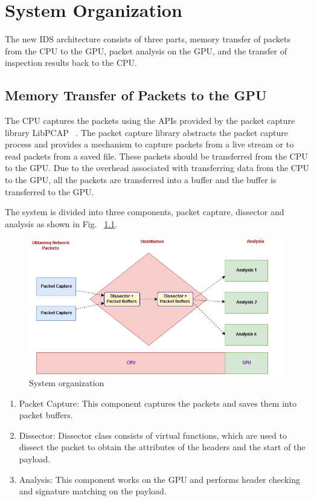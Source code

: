 \chapter{System Organization}
The new IDS architecture consists of three parts, memory transfer of packets from the CPU to the GPU, packet analysis on the GPU, and the transfer of inspection results back to the CPU.

\section{Memory Transfer of Packets to the GPU}
The CPU captures the packets using the APIs provided by the packet capture library LibPCAP ~\cite{bib4}. The packet capture library abstracts the packet capture process and provides a mechanism to capture packets from a live stream or to read packets from a saved file. These packets should be transferred from the CPU to the GPU. Due to the overhead associated with transferring data from the CPU to the GPU, all the packets are transferred into a buffer and the buffer is transferred to the GPU.

The system is divided into three components, packet capture, dissector and analysis as shown in Fig. ~\ref{fig:systemorganization}.

\begin{figure}[H]
	\centering
	\includegraphics[width=14cm]{systemorganization.png}
	\caption[System organization]{System organization \cite{bib1}}
	\label{fig:systemorganization}
\end{figure}
\squeezeup

\begin{enumerate}[leftmargin=*]
	\item Packet Capture: This component captures the packets and saves them into packet buffers.
	\item Dissector: Dissector class consists of virtual functions, which are used to dissect the packet to obtain the attributes of the headers and the start of the payload.
	\item Analysis: This component works on the GPU and performs header checking and signature matching on the payload.
\end{enumerate}
\vspace{\topsep}

